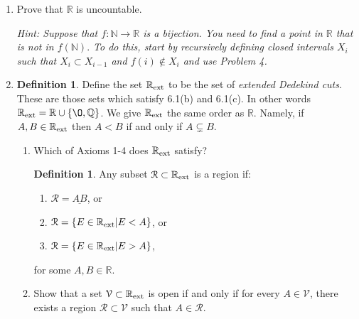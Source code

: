 \documentclass[11pt]{article}
\newcommand{\bbN}{\mathbb{N}}
\newcommand{\bbQ}{\mathbb{Q}}
\newcommand{\bbR}{\mathbb{R}}
\renewcommand{\emptyset}{\O}
\renewcommand{\_}[1]{\underline{ #1 }}
\theoremstyle{definition}
\newtheorem{definition}[theorem]{Definition}
\numberwithin{equation}{subsection}
\begin{document}
\begin{enumerate}
\begin{enumerate}
\begin{proof}
Then, for this $n$, we have that $\frac{1}{n}<|x-y|$ and also $|x-y|<\frac{1}{n}$ (since $x,y \in I_n$), and this contradicts trichotomy of the ordering.

This completes the proof.

\renewcommand\qedsymbol{QED}
\end{proof}


\end{enumerate}


\item
Prove that $\bbR$ is uncountable. 

{\it Hint: Suppose that $f:\bbN\longrightarrow \bbR$ is a bijection. You need to find a point in $\bbR$ that is not in $f(\bbN).$ To do this, start by recursively defining closed intervals $X_i$ such that $X_i\subset X_{i-1}$ and $f(i)\not\in X_i$ and use Problem 4.}




\item 


\begin{definition}
	Define the set $\bbR_{\rm ext}$ to be the set of {\em extended Dedekind cuts}.  These are those sets which satisfy 6.1(b) and 6.1(c).  In other words $\bbR_{\rm ext} = \bbR \cup \{\emptyset, \bbQ\}$.  We give $\bbR_{\rm ext}$ the same order as $\bbR$.  Namely, if $A, B \in \bbR_{\rm ext}$ then $A < B$ if and only if $A \subsetneq B$.
\end{definition}

\begin{enumerate}
\item
	Which of Axioms 1-4 does $\bbR_{\rm ext}$ satisfy?


\begin{definition}
	Any subset $\mathcal{R}%
		 \subset \bbR_{\rm ext}$ is a region if:
	\begin{enumerate}
		\item $\mathcal{R} = \underline{AB}$, or
		\item $\mathcal{R} = \{E \in \bbR_{\rm ext}| E < A\}$, or
		\item $\mathcal{R} = \{E \in \bbR_{\rm ext}| E > A\}$,
	\end{enumerate}
	for some $A, B \in \bbR$.
\end{definition}

\item
	Show that a set $\mathcal{V} \subset \bbR_{\rm ext}$ is open if and only if for every $A \in \mathcal{V}$, there exists a region $\mathcal{R} \subset \mathcal{V}$ such that $A \in \mathcal{R}$.



\end{enumerate}
\end{enumerate}
\end{document}
